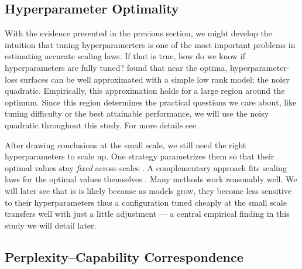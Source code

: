 \subsection{Hyperparameter Optimality}
\label{sec:background:the-noisy-quadratic-limit}

With the evidence presented in the previous section, we might develop the intuition that tuning hyperparamerters is one of the most important problems in estimating accurate scaling laws. 
If that is true, how do we know if hyperparameters are fully tuned? 
\citet{lourie2025hyperparameter} found that near the optima, hyperparameter-loss surfaces can be well approximated with a simple low rank model; the noisy quadratic.
Empirically, this approximation holds for a large region around the optimum. 
Since this region determines the practical questions we care about, like tuning difficulty or the best attainable performance, we will use the noisy quadratic throughout this study. For more details see .

After drawing conclusions at the small scale, we still need the right hyperparameters to scale up. One strategy parametrizes them so that their optimal values stay \textit{fixed} across scales  \citep{yang2021tuning, yang2024tensor, dey2025completep, mlodozeniec2026completed}. A complementary approach fits scaling laws for the optimal values themselves \citep{deepseekai2024deepseekllmscalingopensource, li2025predictablescaleistep, Bergsma2025PowerLines}. 
Many methods work reasonably well. We will later see that is is likely because as models grow, they become less sensitive to their hyperparameters thus a configuration tuned cheaply at the small scale transfers well with just a little adjustment --- a central empirical finding in this study we will detail later.





\subsection{Perplexity--Capability Correspondence}
\label{sec:background:perplexity-capability-correspondence}

